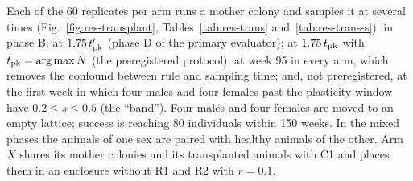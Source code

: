 Each of the 60 replicates per arm runs a mother colony and samples it at several times (Fig.~\ref{fig:res-transplant},
Tables~\ref{tab:res-trans} and~\ref{tab:res-trans-s}): in phase B; at $1.75\,t'_{\rm pk}$ (phase D of the primary
evaluator); at $1.75\,t_{\rm pk}$ with $t_{\rm pk}=\arg\max N$ (the preregistered protocol); at week 95 in every arm,
which removes the confound between rule and sampling time; and, not preregistered, at the first week in which
four males and four females past the plasticity window have $0.2\le s\le0.5$ (the ``band''). Four males and four
females are moved to an empty lattice; success is reaching 80 individuals within 150 weeks. In the mixed phases the
animals of one sex are paired with healthy animals of the other. Arm $X$ shares its mother colonies and its
transplanted animals with \textsf{C1} and places them in an enclosure without R1 and R2 with $r=0.1$.
